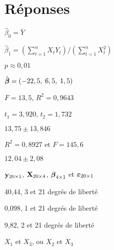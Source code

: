 \bigskip
\section*{Réponses}

\begin{reponse}{3.2}
    \begin{inparaenum}
      \item $\hat{\beta}_0 = \bar{Y}$
      \item $\hat{\beta}_1 = (\sum_{t=1}^n X_t Y_t)/(\sum_{t=1}^n X_t^2)$
      \end{inparaenum}
  
\end{reponse}
\begin{reponse}{3.6}
    $p \approx 0,01$
  
\end{reponse}
\begin{reponse}{3.7}
    \begin{inparaenum}
    \item $\hat{\boldsymbol{\beta}} = (-22,5,\; 6,5,\; 1,5)$
    \item $F = 13,5$, $R^2 = 0,9643$
    \item $t_1 = 3,920$, $t_2 = 1,732$
    \item $13,75 \pm 13,846$
    \end{inparaenum}
  
\end{reponse}
\begin{reponse}{3.8}
    \begin{inparaenum}
    \item $R^2 = 0,8927$ et
      $F = 145,6$
    \item $12,04 \pm
      2,08$
    \end{inparaenum}
  
\end{reponse}
\begin{reponse}{3.10}
    \begin{inparaenum}
    \item $\mathbf{y}_{20 \times 1}$, $\mathbf{X}_{20 \times 4}$, $\boldsymbol{\beta}_{4
        \times 1}$ et $\boldsymbol{\varepsilon}_{20 \times 1}$
    \end{inparaenum}
  
\end{reponse}
\begin{reponse}{3.11}
    \begin{inparaenum}
    \item
      \begin{inparaenum}[i)]
      \item 40,44, 3 et 21 degrés de liberté
      \item 0,098, 1 et 21 degrés de liberté
      \item 9,82, 2 et 21 degrés de liberté
      \end{inparaenum}
    \item $X_1$ et $X_3$, ou $X_2$ et $X_3$
    \end{inparaenum}
  
\end{reponse}
